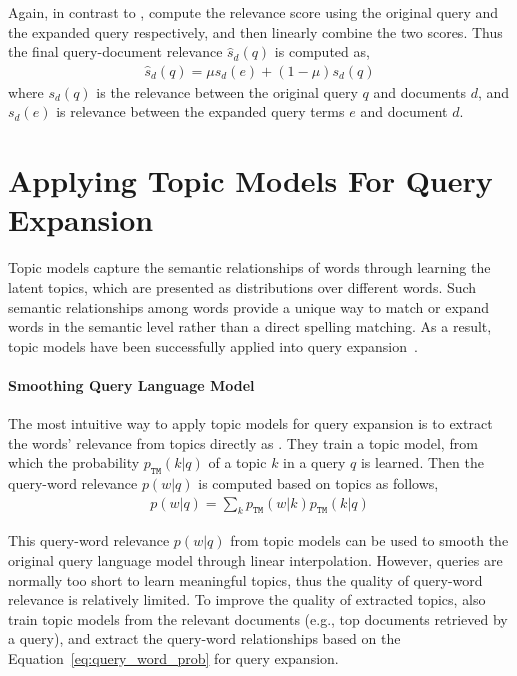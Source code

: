 Again, in contrast to \cite{zhai-01b}, \cite{Lavrenko-2001} compute
the relevance score using the original query and the expanded query
respectively, and then linearly combine the two scores. Thus the final
query-document relevance $\hat{s}_d(q)$ is computed as,
\begin{align}
\label{eq:rm_qe_comb}
\hat{s}_d(q) = \mu s_d(e) + (1-\mu)s_d(q)
\end{align}
where $s_d(q)$ is the relevance between the original query $q$ and documents $d$, and $s_d(e)$ is relevance between the expanded query terms $e$ and document $d$.

\section{Applying Topic Models For Query Expansion}

Topic models capture the semantic relationships of words through learning the latent topics, which are presented as distributions over different words. Such semantic relationships among words provide a unique way to match or expand words in the semantic level rather than a direct spelling matching. As a result, topic models have been successfully applied into query expansion~\citep{Yi-2009,Park-2009}.

\paragraph{Smoothing Query Language Model}

The most intuitive way to apply topic models for query expansion is to extract the words' relevance from topics directly as \cite{Yi-2009}. They train a topic model, from which the probability $p_{\texttt{TM}}(k|q)$ of a topic $k$ in a query $q$ is learned. Then the query-word relevance $p(w|q)$ is computed based on topics as follows,
\begin{align}
\label{eq:query_word_prob}
p(w|q) = \sum_k p_{\texttt{TM}}(w|k) p_{\texttt{TM}}(k|q)
\end{align}

This query-word relevance $p(w|q)$ from topic models can be used to smooth the original query language model through linear interpolation. However, queries are normally too short to learn meaningful topics, thus the quality of query-word relevance is relatively limited. To improve the quality of extracted topics, \cite{Yi-2009} also train topic models from the relevant documents (e.g., top documents retrieved by a query), and extract the query-word relationships based on the Equation~\ref{eq:query_word_prob} for query expansion.

